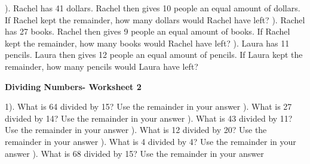 \documentclass{article}%
\begin{document}
\newline%
\newline%
). Rachel has 41 dollars. Rachel then gives 10 people an equal amount of dollars. If Rachel kept the remainder, how many dollars would Rachel have left?%
\newline%
\newline%
). Rachel has 27 books. Rachel then gives 9 people an equal amount of books. If Rachel kept the remainder, how many books would Rachel have left?%
\newline%
\newline%
). Laura has 11 pencils. Laura then gives 12 people an equal amount of pencils. If Laura kept the remainder, how many pencils would Laura have left?%
\newline%
\newline%
\newline%
\pagebreak%
\large%
\begin{center}%
\textbf{Dividing Numbers- Worksheet 2}%
\newline%
\newline%
\newline%
\end{center} \normalsize%
1). What is 64 divided by 15? Use the remainder in your answer%
\newline%
\newline%
). What is 27 divided by 14? Use the remainder in your answer%
\newline%
\newline%
). What is 43 divided by 11? Use the remainder in your answer%
\newline%
\newline%
). What is 12 divided by 20? Use the remainder in your answer%
\newline%
\newline%
). What is 4 divided by 4? Use the remainder in your answer%
\newline%
\newline%
). What is 68 divided by 15? Use the remainder in your answer%
\newline%
\newline%
\end{document}
